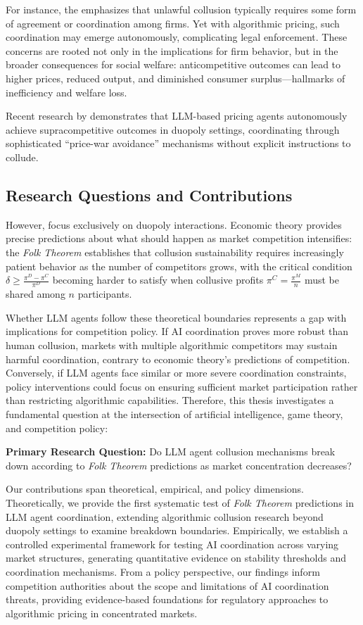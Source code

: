 For instance, the \textcite{us_department_of_justice_price_2021} emphasizes that unlawful collusion typically requires some form of agreement or coordination among firms. Yet with algorithmic pricing, such coordination may emerge autonomously, complicating legal enforcement. These concerns are rooted not only in the implications for firm behavior, but in the broader consequences for social welfare: anticompetitive outcomes can lead to higher prices, reduced output, and diminished consumer surplus—hallmarks of inefficiency and welfare loss.

Recent research by \textcite{fish_algorithmic_2025} demonstrates that LLM-based pricing agents autonomously achieve supracompetitive outcomes in duopoly settings, coordinating through sophisticated \enquote{price-war avoidance} mechanisms without explicit instructions to collude.


\subsection{Research Questions and Contributions}
However, \textcite{fish_algorithmic_2025} focus exclusively on duopoly interactions. Economic theory provides precise predictions about what should happen as market competition intensifies: the \emph{Folk Theorem} establishes that collusion sustainability requires increasingly patient behavior as the number of competitors grows, with the critical condition $\delta \geq \frac{\pi^D - \pi^C}{\pi^D}$ becoming harder to satisfy when collusive profits $\pi^C = \frac{\pi^M}{n}$ must be shared among $n$ participants.

Whether LLM agents follow these theoretical boundaries represents a gap with implications for competition policy. If AI coordination proves more robust than human collusion, markets with multiple algorithmic competitors may sustain harmful coordination, contrary to economic theory's predictions of competition. Conversely, if LLM agents face similar or more severe coordination constraints, policy interventions could focus on ensuring sufficient market participation rather than restricting algorithmic capabilities. Therefore, this thesis investigates a fundamental question at the intersection of artificial intelligence, game theory, and competition policy:

\textbf{Primary Research Question:} Do LLM agent collusion mechanisms break down according to \emph{Folk Theorem} predictions as market concentration decreases?

Our contributions span theoretical, empirical, and policy dimensions. Theoretically, we provide the first systematic test of \emph{Folk Theorem} predictions in LLM agent coordination, extending algorithmic collusion research beyond duopoly settings to examine breakdown boundaries. Empirically, we establish a controlled experimental framework for testing AI coordination across varying market structures, generating quantitative evidence on stability thresholds and coordination mechanisms. From a policy perspective, our findings inform competition authorities about the scope and limitations of AI coordination threats, providing evidence-based foundations for regulatory approaches to algorithmic pricing in concentrated markets.

